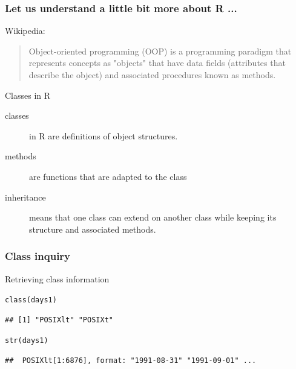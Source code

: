 \documentclass[xcolor=table, xcolor=dvipsnames]{beamer}\usepackage[]{graphicx}\usepackage[]{color}
\makeatletter
\newcommand{\hlstd}[1]{\textcolor[rgb]{0,0,0}{#1}}
\newcommand{\hlkwd}[1]{\textcolor[rgb]{0,0,1}{#1}}
\newenvironment{kframe}{%
 \def\at@end@of@kframe{}%
 \ifinner\ifhmode%
  \def\at@end@of@kframe{\end{minipage}}%
  \begin{minipage}{\columnwidth}%
 \fi\fi%
 \def\FrameCommand##1{\hskip\@totalleftmargin \hskip-\fboxsep
 \colorbox{shadecolor}{##1}\hskip-\fboxsep
     \hskip-\linewidth \hskip-\@totalleftmargin \hskip\columnwidth}%
 \MakeFramed {\advance\hsize-\width
   \@totalleftmargin\z@ \linewidth\hsize
   \@setminipage}}%
 {\par\unskip\endMakeFramed%
 \at@end@of@kframe}
\newenvironment{knitrout}{}{} %
\makeatother
\begin{document}

\begin{frame}[fragile]\frametitle{Let us understand a little bit more about R ...}
Wikipedia: 
\begin{quote}
Object-oriented programming (OOP) is a programming paradigm that represents concepts as "objects" that have data fields (attributes that describe the object) and associated procedures known as methods.
\end{quote}
\begin{block}{Classes in R}
\begin{description}
\item[classes] in R are definitions of object structures.
\item[methods] are functions that are adapted to the class
\item[inheritance] means that one class can extend on another class while keeping its structure and associated methods. 
\end{description}
\end{block}
\end{frame}


\begin{frame}[fragile]\frametitle{Class inquiry}
Retrieving class information 
\begin{knitrout}
\color{fgcolor}\begin{kframe}
\begin{alltt}
\hlkwd{class}\hlstd{(days1)}
\end{alltt}
\begin{verbatim}
## [1] "POSIXlt" "POSIXt"
\end{verbatim}
\begin{alltt}
\hlkwd{str}\hlstd{(days1)}
\end{alltt}
\begin{verbatim}
##  POSIXlt[1:6876], format: "1991-08-31" "1991-09-01" ...
\end{verbatim}
\end{kframe}
\end{knitrout}
\end{frame}

\end{document}
